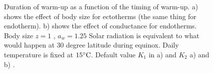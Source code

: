 %
\begin{figure}[H]
\begin{center}
\caption{
	Duration of warm-up as a function of the timing of warm-up.
	a) shows the effect of body size for ectotherms (the same thing for endotherm).
	b)  shows the effect of conductance for endotherms. Body size $z = 1$ , $a_w = 1.25$
	Solar radiation is equivalent to what would happen at 30 degree latitude during equinox.
	Daily temperature is fixed at $15^{\circ}\rm{C}$.
	Default value $K_1$ in a) and $K_2$ a) and b) .
}%
\label{fig5}
\end{center}
\end{figure}
\vspace{-0.8cm}
